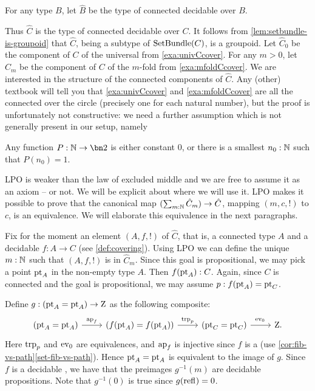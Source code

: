 \begin{definition} \label{def:hatCovering}
For any type $B$, let $\hat B$ be the type of connected decidable \coverings over $B$.
\end{definition}

Thus $\hat C$ is the type of connected decidable \coverings over $C$.
It follows from \cref{lem:setbundle-is-groupoid} that $\hat C$, 
being a subtype of $\mathrm{SetBundle}(C)$, is a groupoid.
Let $\hat C_0$ be the component of $C$ of the universal \covering
from \cref{exa:univCcover}. For any $m>0$, let $\hat C_m$ be the component of $C$
of the $m$-fold \covering from \cref{exa:mfoldCcover}.
We are interested in the structure of the connected components of $\hat C$. 
Any (other) textbook will tell you that \cref{exa:univCcover} and \cref{exa:mfoldCcover}
are all the connected \coverings over 
the circle (precisely one for each natural number), but the proof is unfortunately not constructive: 
we need a further assumption which is not generally present in our setup, namely

\begin{principle}
  \label{LPO}
  Any function $P:\NN\to\bn 2$ is either constant $0$,
  or there is a smallest $n_0:\mathbb{N}$ such that $P(n_0)=1$.
\end{principle}

LPO is weaker than the law of excluded middle and we are free to assume it as an axiom -- or not.
We will be explicit about where we will use it.
LPO makes it possible to prove that the canonical map $(\sum_{m:\mathbb{N}} \hat C_m) \to \hat C$,
mapping $(m,c,!)$ to $c$, is an equivalence.
We will elaborate this equivalence in the next paragraphs.

Fix for the moment an element $(A,f,!)$ of $\hat C$, that is,
a connected type $A$ and a decidable \covering  $f:A\to C$ (see \cref{def:covering}).
Using LPO we can define the unique $m:\mathbb{N}$ such that $(A,f,!)$ is in $\hat C_m$.
Since this goal is propositional, we may pick a point $\mathrm{pt}_A$ in 
the non-empty type $A$. Then $f(\mathrm{pt}_A) : C$. Again, since $C$ is connected
and the goal is propositional, we may assume $p: f(\mathrm{pt}_A) = \mathrm{pt}_C$.

Define $g: (\mathrm{pt}_A=\mathrm{pt}_A)\to\mathrm{Z}$ as the following composite:
\[
  \begin{tikzcd}
    (\pt_A=\pt_A)\ar[r,"\ap{f}"] &
    (f(\pt_A)=f(\pt_A))\ar[r,"\trp{p}"] &
    (\pt_C=\pt_C)\ar[r,"\ev_0\vphantom{\trp{p}}"] &
    \zet.
  \end{tikzcd}
\]
Here $\trp{p}$ and $\ev_0$ are equivalences, and $\ap{f}$ is injective
since $f$ is a \covering (use \cref{cor:fib-vs-path}\ref{set-fib-vs-path}).
Hence $\mathrm{pt}_A=\mathrm{pt}_A$ is equivalent to the image of $g$.
Since $f$ is a decidable \covering, we have that the preimages $g^{-1}(m)$
are decidable propositions. Note that $g^{-1}(0)$ is true since $g(\mathrm{refl}_{})=0$.

